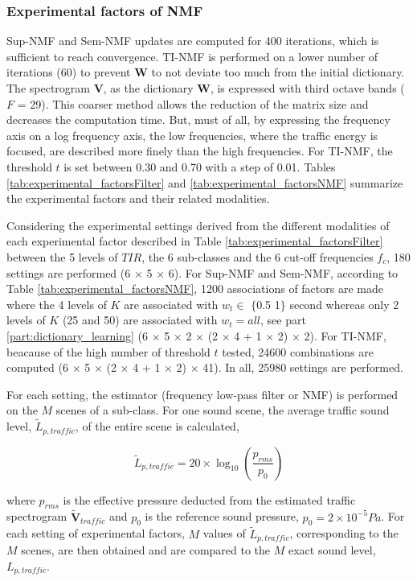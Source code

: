 \documentclass[twocolumn]{svjour3}          %
\begin{document}
\subsubsection{Experimental factors of NMF}

Sup-NMF and Sem-NMF updates are computed for 400 iterations, which is sufficient to reach convergence. TI-NMF is performed on a lower number of iterations (60) to prevent $\mathbf{W}$ to not deviate too much from the initial dictionary.
The spectrogram $\mathbf{V}$, as the dictionary $\mathbf{W}$, is expressed with third octave bands ($F$ = 29). This coarser method allows the reduction of the matrix size and decreases the computation time. But,  must of all, by expressing the frequency axis on a log frequency axis,  the low frequencies, where the traffic energy is focused, are described more finely than the high frequencies. For TI-NMF, the threshold $t$ is set between 0.30 and 0.70 with a step of 0.01. Tables  \ref{tab:experimental_factorsFilter} and \ref{tab:experimental_factorsNMF} summarize the experimental factors and their related modalities.

Considering the experimental settings derived from the different modalities of each experimental factor described in Table \ref{tab:experimental_factorsFilter}  between the 5 levels of $TIR$, the 6 sub-classes and the 6 cut-off frequencies $f_c$, 180 settings are performed (6 $\times$ 5 $\times$ 6). For Sup-NMF and Sem-NMF, according to Table \ref{tab:experimental_factorsNMF},  1200 associations of factors are made where the 4 levels of $K$ are associated with $w_t \in$ $\lbrace$0.5 1$\rbrace$ second whereas only 2 levels of $K$ (25 and 50) are associated with $w_t = all$, see part \ref{part:dictionary_learning} (6 $\times$ 5 $\times$ 2 $\times$ (2 $\times$ 4 + 1 $\times$ 2) $\times$ 2). For TI-NMF, beacause of the high number of threshold $t$ tested, 24600 combinations are computed (6 $\times$ 5 $\times$ (2 $\times$ 4 + 1 $\times$ 2) $\times$ 41). In all, 25980 settings are performed.

For each setting, the estimator (frequency low-pass filter or NMF) is performed on the $M$ scenes of a sub-class. For one sound scene, the average traffic sound level, $\tilde{L}_{p,traffic}$, of the entire scene is calculated,

\begin{equation}
\tilde{L}_{p,traffic} = 20 \times \log_{10}\left(\frac{p_{rms}}{p_0}\right)
\end{equation}

where $p_{rms}$ is the effective pressure deducted from the estimated traffic spectrogram $\mathbf{\tilde{V}}_{traffic}$ and $p_0$ is the reference sound pressure, $p_0 = 2 \times 10^{-5} Pa$.  For each setting of experimental factors, $M$ values of $\tilde{L}_{p,traffic}$, corresponding to the $M$ scenes, are then obtained and are compared to the $M$ exact sound level, $L_{p,traffic}$.
\end{document}
